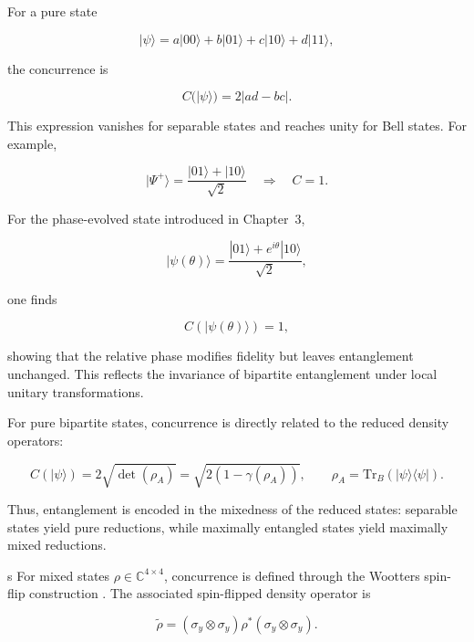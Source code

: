 \medskip

For a pure state

\[
|\psi\rangle
=
a|00\rangle
+
b|01\rangle
+
c|10\rangle
+
d|11\rangle,
\]

the concurrence is

\begin{equation}
C(|\psi\rangle)
=
2|ad-bc|.
\label{eq:pure_state_concurrence}
\end{equation}

This expression vanishes for separable states and reaches unity for Bell states. For example,

\[
|\Psi^+\rangle
=
\frac{|01\rangle + |10\rangle}{\sqrt{2}}
\quad
\Rightarrow
\quad
C=1.
\]

\medskip

For the phase-evolved state introduced in Chapter~3,

\[
|\psi(\theta)\rangle
=
\frac{|01\rangle + e^{i\theta}|10\rangle}{\sqrt{2}},
\]

one finds

\begin{equation}
C(|\psi(\theta)\rangle)
=
1,
\label{eq:phase_state_concurrence}
\end{equation}

showing that the relative phase modifies fidelity but leaves entanglement unchanged. This reflects the invariance of bipartite entanglement under local unitary transformations.

\medskip

For pure bipartite states, concurrence is directly related to the reduced density operators:

\begin{equation}
C(|\psi\rangle)
=
2\sqrt{\det(\rho_A)}
=
\sqrt{
2\left(
1-\gamma(\rho_A)
\right)
},
\qquad
\rho_A
=
\mathrm{Tr}_B
\left(
|\psi\rangle\langle\psi|
\right).
\label{eq:concurrence_reduced_density_relation}
\end{equation}

Thus, entanglement is encoded in the mixedness of the reduced states: separable states yield pure reductions, while maximally entangled states yield maximally mixed reductions.

\medskip
s
For mixed states \( \rho \in \mathbb{C}^{4 \times 4} \), concurrence is defined through the Wootters spin-flip construction \cite{wootters_entanglement_1998}. The associated spin-flipped density operator is

\begin{equation}
\tilde{\rho}
=
(\sigma_y \otimes \sigma_y)
\rho^*
(\sigma_y \otimes \sigma_y).
\label{eq:spin_flipped_density_matrix}
\end{equation}

